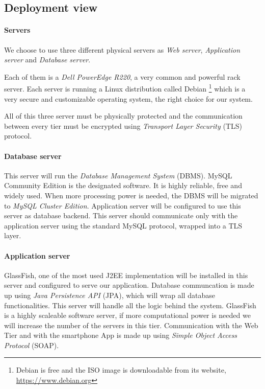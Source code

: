 \newpage
\subsection{Deployment view}
\label{sec:deploy}

\paragraph{Servers} We choose to use three different physical servers as 
\emph{Web server}, \emph{Application server} and \emph{Database server}. 

Each of them is a \emph{Dell PowerEdge R220}\cite{r220}, a very common and 
powerful rack server.
Each server is running a Linux distribution called Debian
\footnote{Debian is free and the ISO image is downloadable from its website, 
\url{https://www.debian.org}}
which is a very secure and customizable operating system, the right choice for our system. 

All of this three server must be physically protected and the communication between
every tier must be encrypted using \emph{Transport Layer Security} (TLS) protocol.

\paragraph{Database server} This server will run the \emph{Database Management System}
(DBMS).
MySQL Community Edition is the designated software. It is highly reliable, free
and widely used. When more processing power is needed, the DBMS will be 
migrated to \emph{MySQL Cluster Edition}. Application server will be configured 
to use this server as database backend.
This server should communicate only with the application server using the standard
MySQL protocol, wrapped into a TLS layer.

\paragraph{Application server} GlassFish, one of the most used J2EE implementation
will be installed in this server and configured to serve our application.
Database communcation is made up using \emph{Java Persistence API} (JPA), which will wrap all
database functionalities. This server will handle all the logic behind the system.
GlassFish is a highly scaleable software server, if more computational power 
is needed we will increase the number of the servers in this tier.
Communication with the Web Tier and with the smartphone App is made up using 
\emph{Simple Object Access Protocol} (SOAP).

